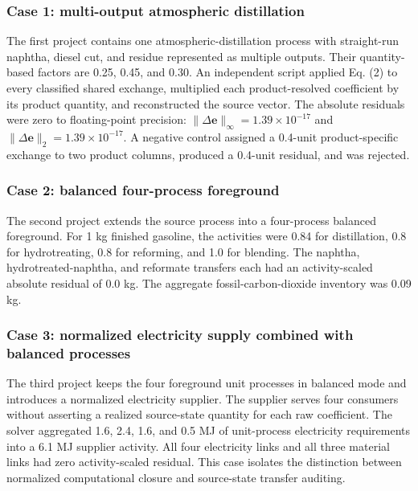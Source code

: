 \documentclass[
  10pt,
  a4paper,
  DIV=11,
  numbers=noendperiod]{scrartcl}
\begin{document}
\subsubsection{Case 1: multi-output atmospheric
distillation}\label{case-1-multi-output-atmospheric-distillation}

The first project contains one atmospheric-distillation process with
straight-run naphtha, diesel cut, and residue represented as multiple
outputs. Their quantity-based factors are 0.25, 0.45, and 0.30. An
independent script applied Eq. (2) to every classified shared exchange,
multiplied each product-resolved coefficient by its product quantity,
and reconstructed the source vector. The absolute residuals were zero to
floating-point precision:
\(\lVert\Delta\mathbf e\rVert_\infty=1.39\times10^{-17}\) and
\(\lVert\Delta\mathbf e\rVert_2=1.39\times10^{-17}\). A negative control
assigned a 0.4-unit product-specific exchange to two product columns,
produced a 0.4-unit residual, and was rejected.

\subsubsection{Case 2: balanced four-process
foreground}\label{case-2-balanced-four-process-foreground}

The second project extends the source process into a four-process
balanced foreground. For 1 kg finished gasoline, the activities were
0.84 for distillation, 0.8 for hydrotreating, 0.8 for reforming, and 1.0
for blending. The naphtha, hydrotreated-naphtha, and reformate transfers
each had an activity-scaled absolute residual of 0.0 kg. The aggregate
fossil-carbon-dioxide inventory was 0.09 kg.

\subsubsection{Case 3: normalized electricity supply combined with
balanced
processes}\label{case-3-normalized-electricity-supply-combined-with-balanced-processes}

The third project keeps the four foreground unit processes in balanced
mode and introduces a normalized electricity supplier. The supplier
serves four consumers without asserting a realized source-state quantity
for each raw coefficient. The solver aggregated 1.6, 2.4, 1.6, and 0.5
MJ of unit-process electricity requirements into a 6.1 MJ supplier
activity. All four electricity links and all three material links had
zero activity-scaled residual. This case isolates the distinction
between normalized computational closure and source-state transfer
auditing.
\end{document}
